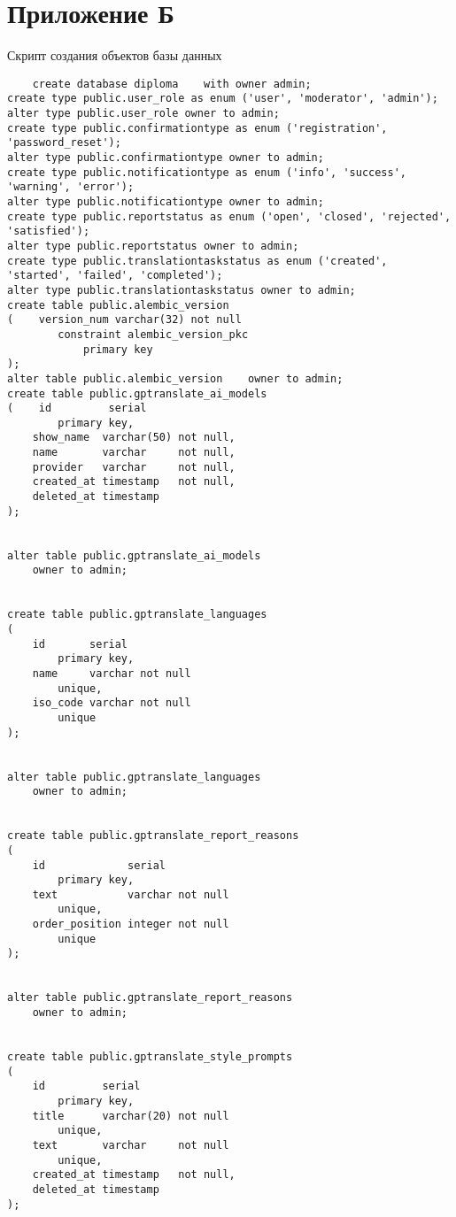 \clearpage
\section*{Приложение Б}

Скрипт создания объектов базы данных

\begin{lstlisting}
    create database diploma    with owner admin;
create type public.user_role as enum ('user', 'moderator', 'admin');
alter type public.user_role owner to admin;
create type public.confirmationtype as enum ('registration', 'password_reset');
alter type public.confirmationtype owner to admin;
create type public.notificationtype as enum ('info', 'success', 'warning', 'error');
alter type public.notificationtype owner to admin;
create type public.reportstatus as enum ('open', 'closed', 'rejected', 'satisfied');
alter type public.reportstatus owner to admin;
create type public.translationtaskstatus as enum ('created', 'started', 'failed', 'completed');
alter type public.translationtaskstatus owner to admin;
create table public.alembic_version
(    version_num varchar(32) not null
        constraint alembic_version_pkc
            primary key
);
alter table public.alembic_version    owner to admin;
create table public.gptranslate_ai_models
(    id         serial
        primary key,
    show_name  varchar(50) not null,
    name       varchar     not null,
    provider   varchar     not null,
    created_at timestamp   not null,
    deleted_at timestamp
);


alter table public.gptranslate_ai_models
    owner to admin;


create table public.gptranslate_languages
(
    id       serial
        primary key,
    name     varchar not null
        unique,
    iso_code varchar not null
        unique
);


alter table public.gptranslate_languages
    owner to admin;


create table public.gptranslate_report_reasons
(
    id             serial
        primary key,
    text           varchar not null
        unique,
    order_position integer not null
        unique
);


alter table public.gptranslate_report_reasons
    owner to admin;


create table public.gptranslate_style_prompts
(
    id         serial
        primary key,
    title      varchar(20) not null
        unique,
    text       varchar     not null
        unique,
    created_at timestamp   not null,
    deleted_at timestamp
);



\end{lstlisting}
